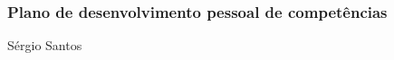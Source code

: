 \begin{frame}
\frametitle{Plano de desenvolvimento pessoal de competências}
\vfill
\hfill {\tiny Sérgio Santos}
\end{frame}
